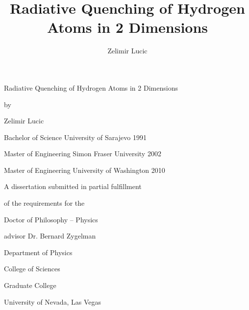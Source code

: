 
\begin{titlepage}
   \begin{center}
       \vspace*{1cm}

Radiative Quenching of Hydrogen Atoms in 2 Dimensions
\title{Radiative Quenching of Hydrogen Atoms in 2 Dimensions}
\vspace{1.5cm}

by 

Zelimir Lucic
\author{Zelimir Lucic}
\vspace{1.5cm}

Bachelor of Science
University of Sarajevo
1991

Master of Engineering
Simon Fraser University
2002

Master of Engineering
University of Washington
2010

\vfill

A dissertation submitted in partial fulfillment

of the requirements for the

Doctor of Philosophy – Physics
\vspace{1cm}

advisor
Dr. Bernard Zygelman

\vspace{1cm}
Department of Physics

College of Sciences

Graduate College

University of Nevada, Las Vegas

\end{center}
\end{titlepage}

